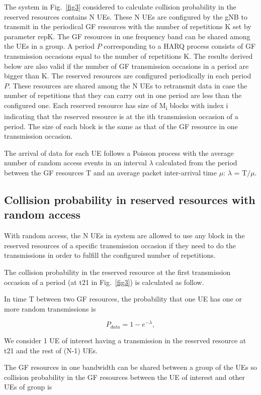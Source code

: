 \documentclass[conference]{IEEEtran}
\begin{document}
The system in Fig.~\ref{fig3} considered to calculate collision probability in the reserved resources contains N UEs. These N UEs are configured by the gNB to transmit in the periodical GF resources with the number of repetitions K set by parameter repK. The GF resources in one frequency band can be shared among the UEs in a group. A period $P$ corresponding to a HARQ process consists of GF transmission occasions equal to the number of repetitions K. The results derived below are also valid if the number of GF transmission occasions in a period are bigger than K. The reserved resources are configured periodically in each period $P$. These resources are shared among the N UEs to retransmit data in case the number of repetitions that they can carry out in one period are less than the configured one. Each reserved resource has size of M\textsubscript{i} blocks with index i indicating that the reserved resource is at the ith transmission occasion of a period. The size of each block is the same as that of the GF resource in one transmission occasion. 

The arrival of data for each UE follows a Poisson process with the average number of random access events in an interval $\lambda$ calculated from the period between the GF resources T and an average packet inter-arrival time $\mu$: $\lambda$ = T$/\mu$.

\subsection{Collision probability in reserved resources with random access}\label{IICC}
With random access, the N UEs in system are allowed to use any block in the reserved resources of a specific transmission occasion if they need to do the transmissions in order to fulfill the configured number of repetitions.

The collision probability in the reserved resource at the first transmission occasion of a period (at t21 in Fig.~\ref{fig3}) is calculated as follow.

In time T between two GF resources, the probability that one UE has one or more random transmissions is 

\begin{equation}
P_{data} = 1 - e^{-\lambda},\label{eq1}
\end{equation}

We consider 1 UE of interest having a transmission in the reserved resource at t21 and the rest of (N-1) UEs.

The GF resources in one bandwidth can be shared between a group of the UEs so collision probability in the GF resources between the UE of interest and other UEs of group is
\end{document}
